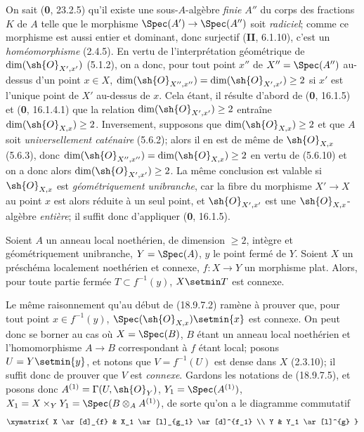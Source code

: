 \begin{remark}[18.9.7.6]
\label{IV.18.9.7.6}
On sait (\textbf{0}, 23.2.5) qu'il existe une sous-$A$-algèbre \emph{finie} $A''$ du corps des fractions $K$ de $A$ telle que le morphisme $\Spec(A')\to\Spec(A'')$ soit \emph{radiciel}; comme ce morphisme est aussi entier et dominant, donc surjectif (\textbf{II}, 6.1.10), c'est un \emph{homéomorphisme} (2.4.5). En vertu de l'interprétation géométrique de $\dim(\sh{O}_{X',x'})$ (5.1.2), on a donc, pour tout point $x''$ de $X''=\Spec(A'')$ au-dessus d'un point $x\in X$, $\dim(\sh{O}_{X'',x''})=\dim(\sh{O}_{X',x'})\geq 2$ si $x'$ est l'unique point de $X'$ au-dessus de $x$. Cela
étant, il résulte d'abord de (\textbf{0}, 16.1.5) et (\textbf{0}, 16.1.4.1) que la relation $\dim(\sh{O}_{X',x'})\geq 2$ entraîne $\dim(\sh{O}_{X,x})\geq 2$. Inversement, supposons que $\dim(\sh{O}_{X,x})\geq 2$ et que $A$ soit \emph{universellement caténaire} (5.6.2); alors il en est de même de $\sh{O}_{X,x}$ (5.6.3), donc $\dim(\sh{O}_{X'',x''})=\dim(\sh{O}_{X,x})\geq 2$ en vertu de (5.6.10) et on a donc alors $\dim(\sh{O}_{X',x'})\geq 2$. La même conclusion est valable si $\sh{O}_{X,x}$ est \emph{géométriquement unibranche}, car la fibre du morphisme $X'\to X$ au point $x$ est alors réduite à un seul point, et $\sh{O}_{X',x'}$ est une $\sh{O}_{X,x}$-algèbre \emph{entière}; il suffit donc d'appliquer (\textbf{0}, 16.1.5).
\end{remark}

\begin{lemma}[18.9.7.7]
\label{IV.18.9.7.7}
Soient $A$ un anneau local noethérien, de dimension $\geq 2$, intègre et géométriquement unibranche, $Y=\Spec(A)$, $y$ le point fermé de $Y$. Soient $X$ un préschéma localement noethérien et connexe, $f:X\to Y$ un morphisme plat. Alors, pour toute partie fermée $T\subset f^{-1}(y)$, $X\setmin T$ est connexe.
\end{lemma}

Le même raisonnement qu'au début de (18.9.7.2) ramène à prouver que, pour tout point $x\in f^{-1}(y)$, $\Spec(\sh{O}_{X,x})\setmin\{x\}$ est connexe. On peut donc se borner au cas où $X=\Spec(B)$, $B$ étant un anneau local noethérien et l'homomorphisme $A\to B$ correspondant à $f$ étant local; posons $U=Y\setmin\{y\}$, et notons que $V=f^{-1}(U)$ est dense dans $X$ (2.3.10); il suffit donc de prouver que $V$ est \emph{connexe}. Gardons les notations de (18.9.7.5), et posons donc $A^{(1)}=\Gamma(U,\sh{O}_Y)$, $Y_1=\Spec(A^{(1)})$, $X_1=X\times_Y Y_1=\Spec(B\otimes_A A^{(1)})$, de sorte qu'on a le diagramme commutatif
\[
  \xymatrix{
    X \ar[d]_{f} & X_1 \ar[l]_{g_1} \ar[d]^{f_1} \\
    Y & Y_1 \ar[l]^{g}
  }
\]

